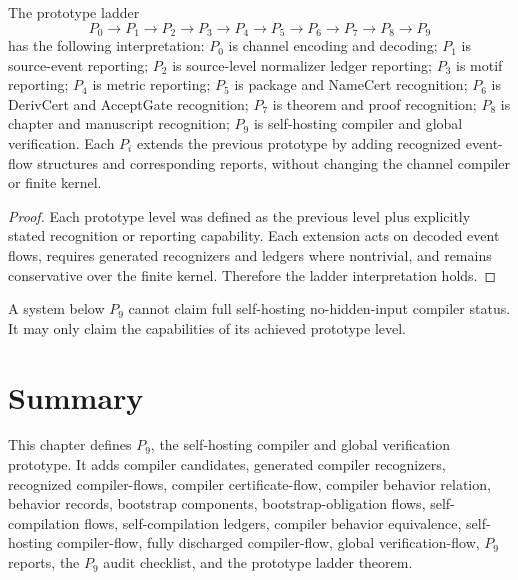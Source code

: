 \begin{theorem}
\label{thm:self-hosting-prototype-ladder}
The prototype ladder
$$
  P_0\to P_1\to P_2\to P_3\to P_4\to P_5\to P_6\to P_7\to P_8\to P_9
$$
has the following interpretation: $P_0$ is channel encoding and decoding; $P_1$ is source-event reporting; $P_2$ is source-level normalizer ledger reporting; $P_3$ is motif reporting; $P_4$ is metric reporting; $P_5$ is package and NameCert recognition; $P_6$ is DerivCert and AcceptGate recognition; $P_7$ is theorem and proof recognition; $P_8$ is chapter and manuscript recognition; $P_9$ is self-hosting compiler and global verification. Each $P_i$ extends the previous prototype by adding recognized event-flow structures and corresponding reports, without changing the channel compiler or finite kernel.
\end{theorem}

\begin{proof}
Each prototype level was defined as the previous level plus explicitly stated recognition or reporting capability. Each extension acts on decoded event flows, requires generated recognizers and ledgers where nontrivial, and remains conservative over the finite kernel. Therefore the ladder interpretation holds.
\end{proof}

\begin{corollary}
\label{cor:self-hosting-full-claim-p9-level}
A system below $P_9$ cannot claim full self-hosting no-hidden-input compiler status. It may only claim the capabilities of its achieved prototype level.
\end{corollary}

\section{Summary}
\label{sec:self-hosting-summary}

This chapter defines $P_9$, the self-hosting compiler and global verification prototype. It adds compiler candidates, generated compiler recognizers, recognized compiler-flows, compiler certificate-flow, compiler behavior relation, behavior records, bootstrap components, bootstrap-obligation flows, self-compilation flows, self-compilation ledgers, compiler behavior equivalence, self-hosting compiler-flow, fully discharged compiler-flow, global verification-flow, $P_9$ reports, the $P_9$ audit checklist, and the prototype ladder theorem.

